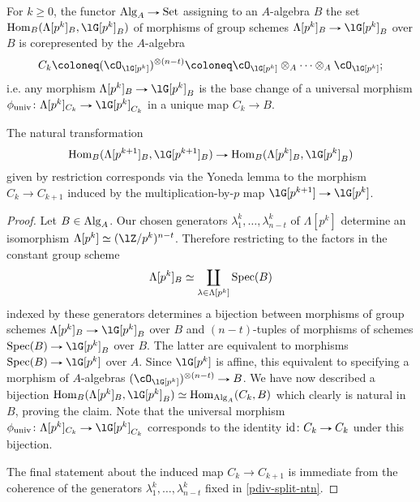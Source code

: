 \begin{lemma}
  \label{pdiv-split-hom}
  For $k \ge 0$, the functor $\Alg_A \to \Set$ assigning to an
  $A$-algebra $B$ the set $\Hom_B(\Lambda[p^k]_B, \lG[p^k]_B)$ of
  morphisms of group schemes $\Lambda[p^k]_B \to \lG[p^k]_B$ over $B$
  is corepresented by the $A$-algebra
  \[
  C_k \ce (\cO_{\lG[p^k]})^{\otimes(n-t)} \ce \cO_{\lG[p^k]}
  \otimes_A \cdots \otimes_A \cO_{\lG[p^k]};
  \]
  i.e. any morphism $\Lambda[p^k]_B \to \lG[p^k]_B$ is the base change
  of a universal morphism
  $\phi_\univ \c \Lambda[p^k]_{C_k} \to \lG[p^k]_{C_k}$ in a
  unique map $C_k \to B$.

  The natural transformation
  \[
  \Hom_B(\Lambda[p^{k+1}]_B,\lG[p^{k+1}]_B) \to
  \Hom_B(\Lambda[p^k]_B,\lG[p^k]_B)
  \]
  given by restriction corresponds via the Yoneda lemma to the
  morphism $C_k \to C_{k+1}$ induced by the multiplication-by-$p$ map
  $\lG[p^{k+1}] \to \lG[p^k]$.
\end{lemma}

\begin{proof}
  Let $B \in \mathrm{Alg}_A$. Our chosen generators
  $\lambda^k_1, \ldots, \lambda^k_{n-t}$ of $\Lambda[p^k]$ determine
  an isomorphism $\Lambda[p^k] \iso (\lZ/p^k)^{n-t}$. Therefore
  restricting to the factors in the constant group scheme
  \[
  \Lambda[p^k]_B \simeq \coprod_{\lambda \in \Lambda[p^k]} \operatorname{Spec}(B)
  \]
  indexed by these generators determines a bijection between morphisms
  of group schemes $\Lambda[p^k]_B \to \lG[p^k]_B$ over $B$ and
  $(n-t)$-tuples of morphisms of schemes $\Spec(B) \to \lG[p^k]_B$
  over $B$. The latter are equivalent to morphisms
  $\Spec(B) \to \lG[p^k]$ over $A$. Since $\lG[p^k]$ is affine, this
  equivalent to specifying a morphism of $A$-algebras
  $(\cO_{\lG[p^k]})^{\otimes(n-t)} \to B$. We have now described a
  bijection
  $\Hom_B(\Lambda[p^k]_B, \lG[p^k]_B) \iso \Hom_{\Alg_A}(C_k,B)$ which
  clearly is natural in $B$, proving the claim. Note that the
  universal morphism
  $\phi_\univ \c \Lambda[p^k]_{C_k} \to \lG[p^k]_{C_k}$ corresponds to
  the identity $\id \c C_k \to C_k$ under this bijection.

  The final statement about the induced map $C_k \to C_{k+1}$ is
  immediate from the coherence of the generators $\lambda^k_1, \ldots,
  \lambda^k_{n-t}$ fixed in \cref{pdiv-split-ntn}.
\end{proof}

